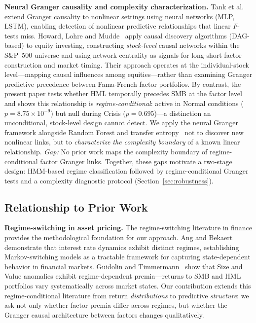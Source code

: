 \documentclass[sigconf,anonymous]{acmart}
\begin{document}
\textbf{Neural Granger causality and complexity characterization.}
Tank et al.~\cite{tank2022neural} extend Granger causality to nonlinear settings
using neural networks (MLP, LSTM), enabling detection of nonlinear predictive
relationships that linear $F$-tests miss. Howard, Lohre and
Mudde~\cite{howard2025causal} apply causal discovery algorithms (DAG-based) to
equity investing, constructing \emph{stock-level} causal networks within the S\&P~500
universe and using network centrality as signals for long-short factor construction
and market timing.
Their approach operates at the individual-stock level---mapping causal influences
among equities---rather than examining Granger predictive precedence between
Fama-French factor portfolios. By contrast, the present paper tests whether HML
temporally precedes SMB at the factor level and shows this relationship is
\emph{regime-conditional}: active in Normal conditions ($p = 8.75\times10^{-9}$)
but null during Crisis ($p=0.695$)---a distinction an unconditional, stock-level
design cannot detect.
We apply the neural Granger framework alongside
Random Forest and transfer entropy~\cite{schreiber2000measuring,marschinski2002analysing,frenzel2007partial} not to discover
new nonlinear links, but to \emph{characterize the complexity boundary} of
a known linear relationship. \textit{Gap:} No prior work maps the complexity
boundary of regime-conditional factor Granger links.
Together, these gaps motivate a two-stage design: HMM-based regime classification
followed by regime-conditional Granger tests and a complexity diagnostic protocol
(Section~\ref{sec:robustness}).

\subsection{Relationship to Prior Work}

\textbf{Regime-switching in asset pricing.}
The regime-switching literature in finance provides the methodological foundation for
our approach. Ang and Bekaert~\cite{ang2002interest} demonstrate that interest rate
dynamics exhibit distinct regimes, establishing Markov-switching models as a tractable
framework for capturing state-dependent behavior in financial markets. Guidolin and
Timmermann~\cite{guidolin2008size} show that Size and Value anomalies exhibit
regime-dependent premia---returns to SMB and HML portfolios vary systematically across
market states. Our contribution extends this regime-conditional literature from return
\emph{distributions} to predictive \emph{structure}: we ask not only whether factor
premia differ across regimes, but whether the Granger causal architecture between
factors changes qualitatively.
\end{document}
